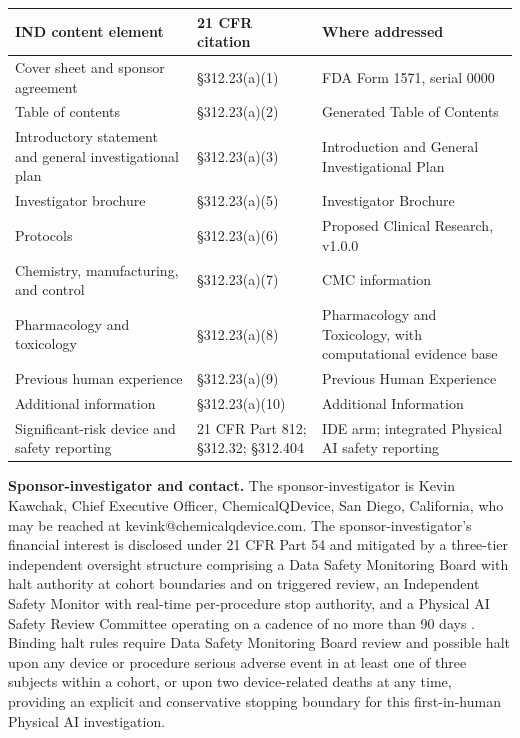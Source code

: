 \noindent\begin{tabularx}{\textwidth}{L{6.3cm} L{3.1cm} Y}
\toprule
\textbf{IND content element} & \textbf{21 CFR citation} & \textbf{Where addressed} \\
\midrule
Cover sheet and sponsor agreement & \S 312.23(a)(1) & FDA Form 1571, serial 0000 \\
Table of contents & \S 312.23(a)(2) & Generated Table of Contents \\
Introductory statement and general investigational plan & \S 312.23(a)(3) & Introduction and General Investigational Plan \\
Investigator brochure & \S 312.23(a)(5) & Investigator Brochure \\
Protocols & \S 312.23(a)(6) & Proposed Clinical Research, v1.0.0 \\
Chemistry, manufacturing, and control & \S 312.23(a)(7) & CMC information \\
Pharmacology and toxicology & \S 312.23(a)(8) & Pharmacology and Toxicology, with computational evidence base \\
Previous human experience & \S 312.23(a)(9) & Previous Human Experience \\
Additional information & \S 312.23(a)(10) & Additional Information \\
Significant-risk device and safety reporting & 21 CFR Part 812; \S 312.32; \S 312.404 & IDE arm; integrated Physical AI safety reporting \\
\bottomrule
\end{tabularx}
\vspace{-0.3cm}

\clearpage

\noindent\textbf{Sponsor-investigator and contact.} The sponsor-investigator is Kevin Kawchak, Chief Executive Officer, ChemicalQDevice, San Diego, California, who may be reached at kevink@chemicalqdevice.com. The sponsor-investigator's financial interest is disclosed under 21 CFR Part 54 and mitigated by a three-tier independent oversight structure comprising a Data Safety Monitoring Board with halt authority at cohort boundaries and on triggered review, an Independent Safety Monitor with real-time per-procedure stop authority, and a Physical AI Safety Review Committee operating on a cadence of no more than 90 days \cite{paisitedocpk}. Binding halt rules require Data Safety Monitoring Board review and possible halt upon any device or procedure serious adverse event in at least one of three subjects within a cohort, or upon two device-related deaths at any time, providing an explicit and conservative stopping boundary for this first-in-human Physical AI investigation.

